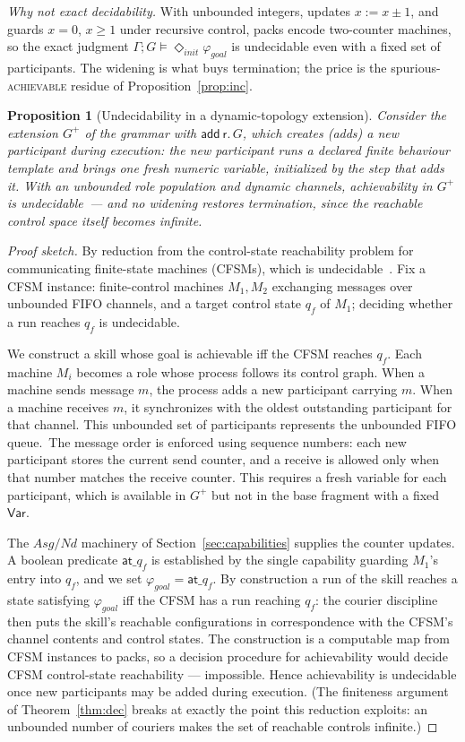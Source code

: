 \documentclass{article}
\theoremstyle{plain}
\newtheorem{proposition}{Proposition}
\theoremstyle{definition}
\newcommand{\Var}{\mathsf{Var}}
\newcommand{\Asg}{\mathit{Asg}}
\newcommand{\Nd}{\mathit{Nd}}
\newcommand{\gphi}{\varphi_{\mathit{goal}}}
\newcommand{\achinit}{\vDash\Diamond_{\mathit{init}}}
\def \bgc {}
\def \egc {}
\begin{document}
\bgc\noindent\emph{Why not exact decidability.} With unbounded integers,
updates $x:=x\pm1$, and guards $x=0$, $x\ge1$ under recursive control, packs
encode two-counter machines, so the exact judgment $\Gamma;G\achinit\gphi$ is
undecidable even with a fixed set of participants. The widening is what buys
termination; the price is the spurious-\textsc{achievable} residue of
Proposition~\ref{prop:inc}.\egc
\begin{proposition}[Undecidability in a dynamic-topology extension]\label{thm:undec}
Consider the extension $G^+$ of the grammar with
\bgc$\mathsf{add}\ \mathsf r.\,G$, which creates (adds) a new participant during
execution: the new participant runs a declared finite behaviour template and
brings one fresh numeric variable, initialized by the step that adds it\egc.
With an unbounded role population and dynamic channels, achievability in $G^+$
is undecidable\bgc\ --- and no widening restores termination, since the
reachable control space itself becomes infinite\egc.
\end{proposition}
\begin{proof}[Proof sketch]
By reduction from the control-state reachability problem for communicating
finite-state machines (CFSMs), which is undecidable~\cite{bz}. Fix a CFSM instance:
finite-control machines $M_1,M_2$ exchanging messages over unbounded FIFO
channels, and a target control state $q_f$ of $M_1$; deciding whether a run reaches
$q_f$ is undecidable.

We construct a skill whose goal is achievable iff the CFSM reaches $q_f$. Each
machine $M_i$ becomes a role whose process follows its control graph. When a
machine sends message $m$, \bgc the process adds a new participant carrying
$m$. When a machine receives $m$, it synchronizes with the oldest outstanding
participant for that channel. This unbounded set of participants represents
the unbounded FIFO queue.\egc\ The message order is enforced using sequence
numbers: each new participant stores the current send counter, and a receive
is allowed only when that number matches the receive counter. \bgc This requires
a fresh variable for each participant, which is available in $G^+$ but not in
the base fragment with a fixed $\Var$.\egc

The $\Asg/\Nd$ machinery of
Section~\ref{sec:capabilities} supplies \bgc the counter updates\egc. A boolean predicate
$\mathsf{at\_}q_f$ is established by the single capability guarding $M_1$'s entry
into $q_f$, and we set $\gphi=\mathsf{at\_}q_f$. By construction a run of the skill
reaches a state satisfying $\gphi$ iff the CFSM has a run reaching $q_f$: the
courier discipline then puts the skill's reachable configurations in
correspondence with the CFSM's channel contents and control states. The
construction is a computable map
from CFSM instances to packs, so a decision procedure for achievability would
decide CFSM control-state reachability --- impossible. Hence achievability is
undecidable once \bgc new participants may be added during execution\egc. (The finiteness argument
of Theorem~\ref{thm:dec} breaks at exactly the point this reduction exploits: an
unbounded number of couriers makes the set of reachable controls infinite.)
\end{proof}
\end{document}
